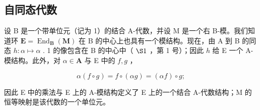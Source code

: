 \subsection{自同态代数}

设 B 是一个带单位元（记为 1）的结合 A-代数，并设 M 是一个右 B-模。我们知道环 \(\mathbf{E} = \operatorname{End}_{\mathbf{B}}(\mathbf{M})\) 在 B 的中心上也具有一个模结构。现在，由 A 到 B 的同态 \(h: \alpha \mapsto \alpha\) . 1 的像包含在 B 的中心中（ \(\S 1\) ，第 1 号）；因此 \(h\) 给 E 一个 A-模结构。此外，对 \(\alpha \in \mathbf{A}\) 与 E 中的 \(f, g\) ，

\[
\alpha (f \circ g) = f \circ (\alpha g) = (\alpha f) \circ g;
\]

因此 E 中的乘法与 E 上的 A-模结构定义了 E 上的一个结合 A-代数结构；M 的恒等映射是该代数的一个单位元。

